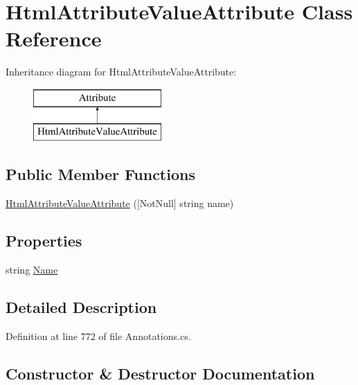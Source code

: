 \hypertarget{class_html_attribute_value_attribute}{}\section{Html\+Attribute\+Value\+Attribute Class Reference}
\label{class_html_attribute_value_attribute}
Inheritance diagram for Html\+Attribute\+Value\+Attribute\+:\begin{figure}[H]
\begin{center}
\leavevmode
\includegraphics[height=2.000000cm]{class_html_attribute_value_attribute}
\end{center}
\end{figure}
\subsection*{Public Member Functions}
\begin{DoxyCompactItemize}
\item 
\hyperlink{class_html_attribute_value_attribute_a24f0c95d001e3e601263186ca45098a4}{Html\+Attribute\+Value\+Attribute} (\mbox{[}Not\+Null\mbox{]} string name)
\end{DoxyCompactItemize}
\subsection*{Properties}
\begin{DoxyCompactItemize}
\item 
string \hyperlink{class_html_attribute_value_attribute_ae46f5471839e8bf67fe5177f2b01e514}{Name}
\end{DoxyCompactItemize}


\subsection{Detailed Description}


Definition at line 772 of file Annotations.\+cs.



\subsection{Constructor \& Destructor Documentation}
\hypertarget{class_html_attribute_value_attribute_a24f0c95d001e3e601263186ca45098a4}{}
